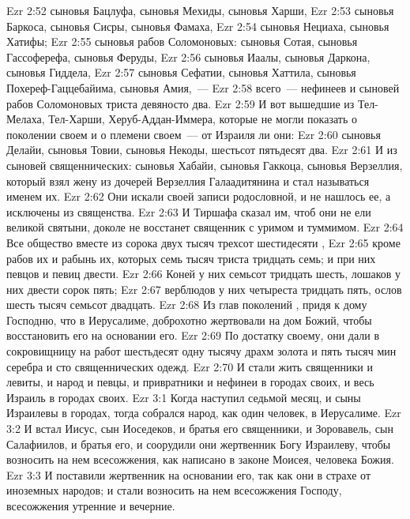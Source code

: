 \vs Ezr 2:52 сыновья Бацлуфа, сыновья Мехиды, сыновья Харши,
\vs Ezr 2:53 сыновья Баркоса, сыновья Сисры, сыновья Фамаха,
\vs Ezr 2:54 сыновья Нециаха, сыновья Хатифы;
\vs Ezr 2:55 сыновья рабов Соломоновых: сыновья Сотая, сыновья Гассоферефа, сыновья Феруды,
\vs Ezr 2:56 сыновья Иаалы, сыновья Даркона, сыновья Гиддела,
\vs Ezr 2:57 сыновья Сефатии, сыновья Хаттила, сыновья Похереф-Гаццебайима, сыновья Амия,~---
\vs Ezr 2:58 всего~--- нефинеев и сыновей рабов Соломоновых триста девяносто два.
\rsbpar\vs Ezr 2:59 И вот вышедшие из Тел-Мелаха, Тел-Харши, Херуб-Аддан-Иммера, которые не могли показать о поколении своем и о племени своем~--- от Израиля ли они:
\vs Ezr 2:60 сыновья Делайи, сыновья Товии, сыновья Некоды, шестьсот пятьдесят два.
\vs Ezr 2:61 И из сыновей священнических: сыновья Хабайи, сыновья Гаккоца, сыновья Верзеллия, который взял жену из дочерей Верзеллия Галаадитянина и стал называться именем их.
\vs Ezr 2:62 Они искали своей записи родословной, и не нашлось ее, а  исключены из священства.
\vs Ezr 2:63 И Тиршафа сказал им, чтоб они не ели великой святыни, доколе не восстанет священник с уримом и туммимом.
\rsbpar\vs Ezr 2:64 Все общество вместе  из сорока двух тысяч трехсот шестидесяти ,
\vs Ezr 2:65 кроме рабов их и рабынь их, которых  семь тысяч триста тридцать семь; и при них певцов и певиц двести.
\vs Ezr 2:66 Коней у них семьсот тридцать шесть, лошаков у них двести сорок пять;
\vs Ezr 2:67 верблюдов у них четыреста тридцать пять, ослов шесть тысяч семьсот двадцать.
\rsbpar\vs Ezr 2:68 Из глав поколений , придя к дому Господню, что в Иерусалиме, доброхотно жертвовали на дом Божий, чтобы восстановить его на основании его.
\vs Ezr 2:69 По достатку своему, они дали в сокровищницу на  работ шестьдесят одну тысячу драхм золота и пять тысяч мин серебра и сто священнических одежд.
\rsbpar\vs Ezr 2:70 И стали жить священники и левиты, и народ и певцы, и привратники и нефинеи в городах своих, и весь Израиль в городах своих.
\vs Ezr 3:1 Когда наступил седьмой месяц, и сыны Израилевы  в городах, тогда собрался народ, как один человек, в Иерусалиме.
\vs Ezr 3:2 И встал Иисус, сын Иоседеков, и братья его священники, и Зоровавель, сын Салафиилов, и братья его, и соорудили они жертвенник Богу Израилеву, чтобы возносить на нем всесожжения, как написано в законе Моисея, человека Божия.
\vs Ezr 3:3 И поставили жертвенник на основании его, так как они  в страхе от иноземных народов; и стали возносить на нем всесожжения Господу, всесожжения утренние и вечерние.
